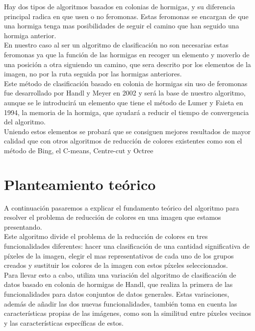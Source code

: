 \documentclass{pid}
\begin{document}
Hay dos tipos de algoritmos basados en colonias de hormigas, y su diferencia principal radica en que usen o no feromonas. Estas feromonas se encargan de que una hormiga tenga mas posibilidades de seguir el camino que han seguido una hormiga anterior. \\

En nuestro caso al ser un algoritmo de clasificación no son necesarias estas feromonas ya que la función de las hormigas en recoger un elemento y moverlo de una posición a otra siguiendo un camino, que sera descrito por los elementos de la imagen, no por la ruta seguida por las hormigas anteriores. \\

Este método de clasificación basado en colonia de hormigas sin uso de feromonas fue desarrollado por Handl y Meyer en 2002 y será la base de nuestro algoritmo, aunque se le introducirá un elemento que tiene el método de Lumer y Faieta en 1994, la memoria de la hormiga, que ayudará a reducir el tiempo de convergencia del algoritmo.\\

Uniendo estos elementos se probará que se consiguen mejores resultados de mayor calidad que con otros algoritmos de reducción de colores existentes como son el método de Bing, el C-means, Centre-cut y Octree\\

\section{Planteamiento teórico}
A continuación pasaremos a explicar el fundamento teórico del algoritmo para resolver el problema de reducción de colores en una imagen que estamos presentando.\\

Este algoritmo divide el problema de la reducción de colores en tres funcionalidades diferentes: hacer una clasificación de una cantidad significativa de píxeles de la imagen, elegir el mas representativos de cada uno de los grupos creados y sustituir los colores de la imagen con estos píxeles seleccionados.\\

Para llevar esto a cabo, utiliza una variación del algoritmo de clasificación de datos basado en colonia de hormigas de Handl, que realiza la primera de las funcionalidades para datos conjuntos de datos generales. Estas variaciones, además de añadir las dos nuevas funcionalidades, también toma en cuenta las características propias de las imágenes, como son la similitud entre píxeles vecinos y las características específicas de estos.\\
\end{document}
